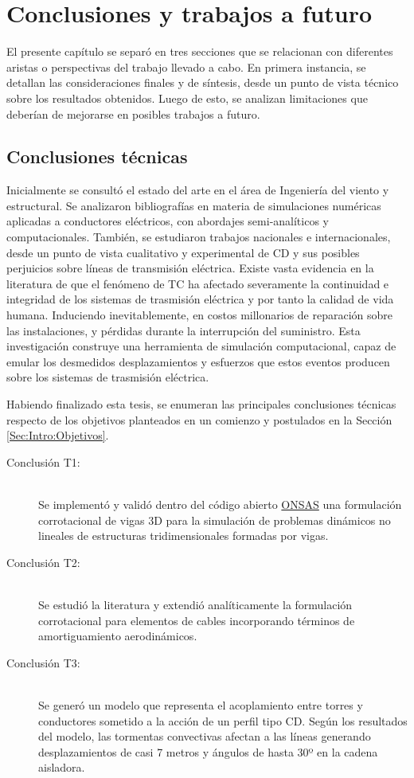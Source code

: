 \chapter{Conclusiones y trabajos a futuro}\label{Cap:Conlcusiones}
\linenumbers

El presente capítulo se separó en tres secciones que se relacionan con diferentes aristas o perspectivas del trabajo llevado a cabo. En primera instancia, se detallan las consideraciones finales y de síntesis, desde un punto de vista técnico sobre los resultados obtenidos. Luego de esto, se analizan limitaciones que deberían de mejorarse en posibles trabajos a futuro.    

\section{Conclusiones técnicas}
Inicialmente se consultó el estado del arte en el área de Ingeniería del viento y estructural. Se analizaron bibliografías en materia de simulaciones numéricas aplicadas a conductores eléctricos, con abordajes semi-analíticos y computacionales. También, se estudiaron trabajos nacionales e internacionales, desde un punto de vista cualitativo y experimental de CD y sus posibles perjuicios sobre líneas de transmisión eléctrica. Existe vasta evidencia en la literatura de que el fenómeno de \gls{TC} ha afectado severamente la continuidad e integridad de los sistemas de trasmisión eléctrica y por tanto la calidad de vida humana. Induciendo inevitablemente, en costos millonarios de reparación sobre las instalaciones, y pérdidas durante la interrupción del suministro. Esta investigación construye una herramienta de simulación computacional, capaz de emular los desmedidos desplazamientos y esfuerzos que estos eventos producen sobre los sistemas de trasmisión eléctrica. 

Habiendo finalizado esta tesis, se enumeran las principales conclusiones técnicas respecto de los objetivos planteados en un comienzo y postulados en la Sección \ref{Sec:Intro:Objetivos}.


\begin{description}
	\item[Conclusión T1:] \hfill \\ Se implementó y validó dentro del código abierto \href{https://github.com/ONSAS/ONSAS.m/}{ONSAS} una formulación corrotacional de vigas 3D para la simulación de problemas dinámicos no lineales de estructuras tridimensionales formadas por vigas.
	\item[Conclusión T2:] \hfill \\ Se estudió la literatura y extendió analíticamente la formulación corrotacional para elementos de cables incorporando términos de amortiguamiento aerodinámicos.
	\item[Conclusión T3:] \hfill \\ Se generó un modelo que representa el acoplamiento entre torres y conductores sometido a la acción de un perfil tipo CD. Según los resultados del modelo, las tormentas convectivas afectan a las líneas generando desplazamientos de casi 7 metros y ángulos de hasta 30º en la cadena aisladora. 
\end{description}

